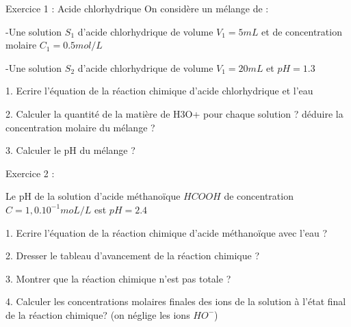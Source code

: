 \documentclass[12pt, french]{article}
\begin{document}
\begin{center}

\end{center}

\vspace{-0.2cm}
   \begin{Box2}{Exercice 1 :  Acide chlorhydrique}
	On considère un mélange de :

	-Une solution $S_1$ d’acide chlorhydrique de volume $V_1 =5mL$ et de concentration molaire $C_1=0.5mol/L$

	-Une solution $S_2$ d’acide chlorhydrique de volume $V_1 =20mL$ et $pH=1.3$

1. Ecrire l'équation de la réaction chimique d’acide chlorhydrique et l’eau

2. Calculer la quantité de la matière de H3O+ pour chaque solution ? déduire la concentration molaire du
mélange ?

3. Calculer le pH du mélange ?

   \end{Box2}


\begin{Box2}{Exercice 2 :}

	Le pH de la solution d’acide méthanoïque $HCOOH$ de concentration $C=1,0.10^{-1}moL/L$ est $pH=2.4$

1. Ecrire l'équation de la réaction chimique d’acide méthanoïque avec l’eau ?

2. Dresser le tableau d'avancement de la réaction chimique ?

3. Montrer que la réaction chimique n’est pas totale ?

4. Calculer les concentrations molaires finales des ions de la solution à l’état final de la réaction chimique? (on
néglige les ions $HO^-$)


\end{Box2}
\end{document}
